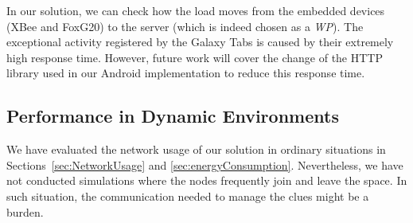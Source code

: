 In our solution, we can check how the load moves from the embedded devices (XBee and FoxG20) to the server (which is indeed chosen as a \emph{WP}).
The exceptional activity registered by the Galaxy Tabs is caused by their extremely high response time.
However, future work will cover the change of the HTTP library used in our Android implementation to reduce this response time.



%



\subsection{Performance in Dynamic Environments}
\label{sec:dynamic}
We have evaluated the network usage of our solution in ordinary situations in Sections~\ref{sec:NetworkUsage} and \ref{sec:energyConsumption}.
Nevertheless, we have not conducted simulations where the nodes frequently join and leave the space.
In such situation, the communication needed to manage the clues might be a burden.




